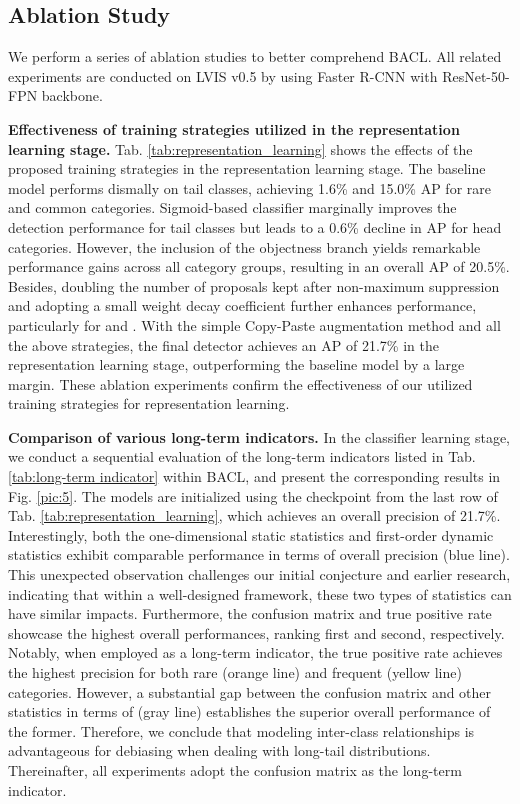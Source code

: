 \documentclass[lettersize,journal]{IEEEtran}
\begin{document}
\subsection{Ablation Study}

We perform a series of ablation studies to better comprehend BACL.
All related experiments are conducted on LVIS v0.5 by using Faster R-CNN with ResNet-50-FPN backbone.


\noindent\textbf{Effectiveness of training strategies utilized in the representation learning stage.}
Tab. \ref{tab:representation_learning} shows the effects of the proposed training strategies in the representation learning stage.
The baseline model performs dismally on tail classes, achieving 1.6\% and 15.0\% AP for rare and common categories.
Sigmoid-based classifier marginally improves the detection performance for tail classes but leads to a 0.6\% decline in AP for head categories.
However, the inclusion of the objectness branch yields remarkable performance gains across all category groups, resulting in an overall AP of 20.5\%.
Besides, doubling the number of proposals kept after non-maximum suppression and adopting a small weight decay coefficient further enhances performance, particularly for  and .
With the simple Copy-Paste augmentation method and all the above strategies, the final detector achieves an AP of 21.7\% in the representation learning stage, outperforming the baseline model by a large margin.
These ablation experiments confirm the effectiveness of our utilized training strategies for representation learning.

\noindent\textbf{Comparison of various long-term indicators.}
In the classifier learning stage, we conduct a sequential evaluation of the long-term indicators listed in Tab. \ref{tab:long-term indicator} within BACL, and present the corresponding results in Fig. \ref{pic:5}.
The models are initialized using the checkpoint from the last row of Tab. \ref{tab:representation_learning}, which achieves an overall precision of 21.7\%.
Interestingly, both the one-dimensional static statistics and first-order dynamic statistics exhibit comparable performance in terms of overall precision (blue line).
This unexpected observation challenges our initial conjecture and earlier research, indicating that within a well-designed framework, these two types of statistics can have similar impacts.
Furthermore, the confusion matrix and true positive rate showcase the highest overall performances, ranking first and second, respectively.
Notably, when employed as a long-term indicator, the true positive rate achieves the highest precision for both rare (orange line) and frequent (yellow line) categories.
However, a substantial gap between the confusion matrix and other statistics in terms of  (gray line) establishes the superior overall performance of the former.
Therefore, we conclude that modeling inter-class relationships is advantageous for debiasing when dealing with long-tail distributions.
Thereinafter, all experiments adopt the confusion matrix as the long-term indicator.
\end{document}
